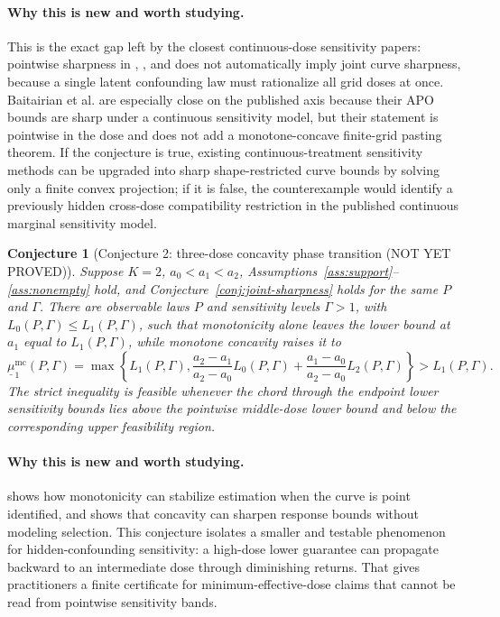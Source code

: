 \documentclass[11pt]{article}
\theoremstyle{definition}
\theoremstyle{plain}
\newtheorem{conjecture}{Conjecture}
\theoremstyle{remark}
\begin{document}
\paragraph{Why this is new and worth studying.}
This is the exact gap left by the closest continuous-dose sensitivity papers: pointwise sharpness in \citet{JessonDouglasManshausenSolalMeinshausenStierGalShalit2022}, \citet{MarmarelisHaddadJessonJahanshadGalstyanVerSteeg2023}, and \citet{BaitairianSebastienJreichKatsahianGuilloux2025} does not automatically imply joint curve sharpness, because a single latent confounding law must rationalize all grid doses at once.  Baitairian et al. are especially close on the published axis because their APO bounds are sharp under a continuous sensitivity model, but their statement is pointwise in the dose and does not add a monotone-concave finite-grid pasting theorem.  If the conjecture is true, existing continuous-treatment sensitivity methods can be upgraded into sharp shape-restricted curve bounds by solving only a finite convex projection; if it is false, the counterexample would identify a previously hidden cross-dose compatibility restriction in the published continuous marginal sensitivity model.

\begin{conjecture}[Conjecture 2: three-dose concavity phase transition (NOT YET PROVED)]\label{conj:phase-transition}
Suppose \(K=2\), \(a_0<a_1<a_2\), Assumptions~\ref{ass:support}--\ref{ass:nonempty} hold, and Conjecture~\ref{conj:joint-sharpness} holds for the same \(P\) and \(\Gamma\).  There are observable laws \(P\) and sensitivity levels \(\Gamma>1\), with \(L_0(P,\Gamma)\le L_1(P,\Gamma)\), such that monotonicity alone leaves the lower bound at \(a_1\) equal to \(L_1(P,\Gamma)\), while monotone concavity raises it to
\[
\underline\mu^{\mathrm{mc}}_1(P,\Gamma)
=
\max\left\{
L_1(P,\Gamma),
\frac{a_2-a_1}{a_2-a_0}L_0(P,\Gamma)
+\frac{a_1-a_0}{a_2-a_0}L_2(P,\Gamma)
\right\}
>L_1(P,\Gamma).
\]
The strict inequality is feasible whenever the chord through the endpoint lower sensitivity bounds lies above the pointwise middle-dose lower bound and below the corresponding upper feasibility region.
\end{conjecture}

\paragraph{Why this is new and worth studying.}
\citet{WestlingGilbertCarone2020} shows how monotonicity can stabilize estimation when the curve is point identified, and \citet{Manski1997} shows that concavity can sharpen response bounds without modeling selection.  This conjecture isolates a smaller and testable phenomenon for hidden-confounding sensitivity: a high-dose lower guarantee can propagate backward to an intermediate dose through diminishing returns.  That gives practitioners a finite certificate for minimum-effective-dose claims that cannot be read from pointwise sensitivity bands.
\end{document}
